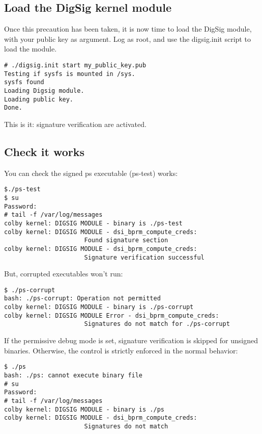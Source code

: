 \documentclass{article}
\begin{document}
\subsection{Load the DigSig kernel module}
\label{sec:load}

Once this precaution has been taken, it is now time to load the DigSig
module, with your public key as argument. 
Log as root, and use the digsig.init script to load the module.

\small
\begin{verbatim} 
# ./digsig.init start my_public_key.pub
Testing if sysfs is mounted in /sys.
sysfs found
Loading Digsig module.
Loading public key.
Done.
\end{verbatim} 
\normalsize

This is it: signature verification are activated. 

\subsection{Check it works}
\label{sec:check}

You can check the 
signed ps executable (ps-test) works:

\small
\begin{verbatim} 
$./ps-test
$ su
Password:
# tail -f /var/log/messages
colby kernel: DIGSIG MODULE - binary is ./ps-test
colby kernel: DIGSIG MODULE - dsi_bprm_compute_creds:
                      Found signature section
colby kernel: DIGSIG MODULE - dsi_bprm_compute_creds:
                      Signature verification successful
\end{verbatim}
\normalsize

But, corrupted executables won't run:
\small
\begin{verbatim} 
$ ./ps-corrupt
bash: ./ps-corrupt: Operation not permitted 
colby kernel: DIGSIG MODULE - binary is ./ps-corrupt
colby kernel: DIGSIG MODULE Error - dsi_bprm_compute_creds:
                      Signatures do not match for ./ps-corrupt
\end{verbatim} 
\normalsize

If the permissive debug mode is set, signature verification is skipped
for unsigned binaries.  Otherwise, the control is strictly enforced in
the normal behavior:

\small
\begin{verbatim} 
$ ./ps
bash: ./ps: cannot execute binary file 
# su 
Password: 
# tail -f /var/log/messages
colby kernel: DIGSIG MODULE - binary is ./ps
colby kernel: DIGSIG MODULE - dsi_bprm_compute_creds:
                      Signatures do not match
\end{verbatim}
\normalsize
\end{document}
